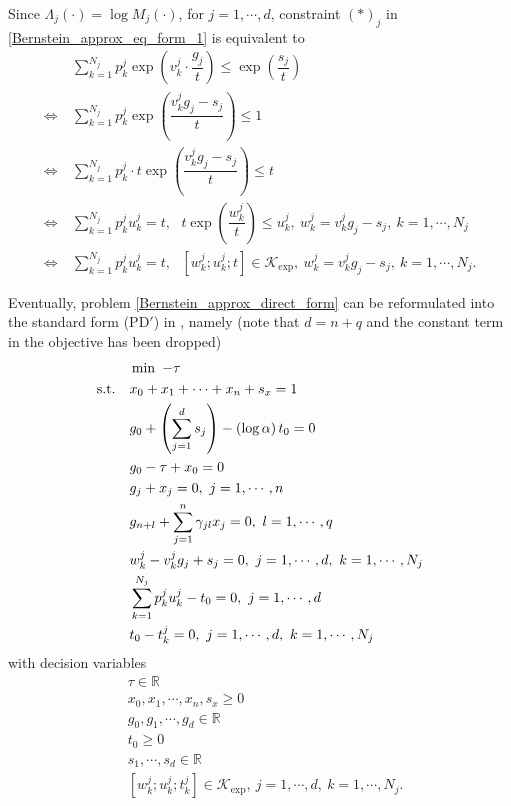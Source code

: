 \documentclass[11pt]{article}
\begin{document}
Since $\Lambda_j\left(\cdot\right) = \log M_j \left(\cdot\right)$, for $j=1, \cdots, d$, constraint $(*)_j$ in \eqref{Bernstein_approx_eq_form_1} is equivalent to 
\begin{align*}
&\sum_{k=1}^{N_j} p_k^j \exp \left(v_k^j \cdot \dfrac{g_j}{t}\right) \leq \exp\left(\dfrac{s_j}{t}\right) \\
\Leftrightarrow\ & \sum_{k=1}^{N_j} p_k^j \exp\left(\dfrac{v_k^j g_j - s_j}{t}\right) \leq 1 \\
\Leftrightarrow\ & \sum_{k=1}^{N_j} p_k^j\cdot  t \exp\left(\dfrac{v_k^j g_j - s_j}{t}\right) \leq t \\
\Leftrightarrow\ & \sum_{k=1}^{N_j} p_k^ju_k^j = t,\ \ \ t\exp\left(\dfrac{w_k^j}{t}\right) \leq u_k^j,\ w_k^j =v_k^j g_j - s_j,\ k = 1, \cdots, N_j \\
\Leftrightarrow\ & \sum_{k=1}^{N_j} p_k^ju_k^j = t,\ \ \ \left[w_k^j; u_k^j; t\right] \in \mathcal{K}_{\exp},\ w_k^j =v_k^j g_j - s_j,\ k = 1, \cdots, N_j.
\end{align*}

Eventually, problem \eqref{Bernstein_approx_direct_form} can be reformulated into the standard form (PD$'$) in \cite{Gao_Yuan_thesis}, namely (note that $d = n+q$ and the constant term in the objective has been dropped)
\begin{align}
\begin{split}\label{reformulated_std_conic_form}
&\min \ -\tau \\ 
\textnormal{s.t.}\ \ \ & x_0 + x_1 + \cdots + x_n + s_x = 1 \\
& g_0 + \left(\sum_{j=1}^d s_j\right) - \left(\log \alpha\right) t_0 = 0 \\
& g_0  - \tau + x_0 = 0 \\
& g_j + x_j = 0,\ j = 1, \cdots, n \\
& g_{n+l} + \sum_{j=1}^n \gamma_{jl} x_j = 0,\ l = 1, \cdots, q \\
& w_k^j - v_k^j g_j + s_j = 0,\ j = 1, \cdots,d,\ k = 1, \cdots, N_j \\
& \sum_{k=1}^{N_j} p_k^j u_k^j - t_0 = 0,\  j =1,\cdots,d \\
& t_0 - t_k^j = 0,\ j = 1,\cdots, d,\ k = 1,\cdots,N_j
\end{split}
\end{align}
with decision variables
\begin{align*}
& \tau \in \mathbb{R} \\
& x_0, x_1, \cdots, x_n, s_x \geq 0 \\
& g_0, g_1, \cdots, g_d \in \mathbb{R} \\
& t_0 \geq 0 \\
& s_1, \cdots, s_d \in \mathbb{R} \\
& \left[w_k^j; u_k^j; t_k^j\right] \in \mathcal{K}_{\exp},\ j = 1, \cdots, d,\ k = 1,\cdots, N_j.
\end{align*}
\end{document}
